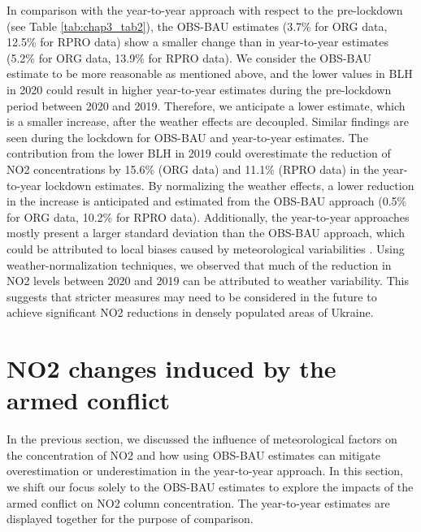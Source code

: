 In comparison with the year-to-year approach with respect to the pre-lockdown (see Table \ref{tab:chap3_tab2}), the OBS-BAU estimates (3.7\% for ORG data, 12.5\% for RPRO data) show a smaller change than in year-to-year estimates (5.2\% for ORG data, 13.9\% for RPRO data). We consider the OBS-BAU estimate to be more reasonable as mentioned above, and the lower values in BLH in 2020 could result in higher year-to-year estimates during the pre-lockdown period between 2020 and 2019. Therefore, we anticipate a lower estimate, which is a smaller increase, after the weather effects are decoupled. Similar findings are seen during the lockdown for OBS-BAU and year-to-year estimates. The contribution from the lower BLH in 2019 could overestimate the reduction of NO2 concentrations by 15.6\% (ORG data) and 11.1\% (RPRO data) in the year-to-year lockdown estimates. By normalizing the weather effects, a lower reduction in the increase is anticipated and estimated from the OBS-BAU approach (0.5\% for ORG data, 10.2\% for RPRO data). Additionally, the year-to-year approaches mostly present a larger standard deviation than the OBS-BAU approach, which could be attributed to local biases caused by meteorological variabilities \citep{barre2021estimating}. Using weather-normalization techniques, we observed that much of the reduction in NO2 levels between 2020 and 2019 can be attributed to weather variability. This suggests that stricter measures may need to be considered in the future to achieve significant NO2 reductions in densely populated areas of Ukraine.\par

\section{NO2 changes induced by the armed conflict} \label{chap3_war}
In the previous section, we discussed the influence of meteorological factors on the concentration of NO2 and how using OBS-BAU estimates can mitigate overestimation or underestimation in the year-to-year approach. In this section, we shift our focus solely to the OBS-BAU estimates to explore the impacts of the armed conflict on NO2 column concentration. The year-to-year estimates are displayed together for the purpose of comparison.\par


